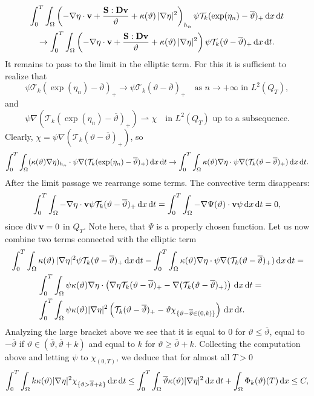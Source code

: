 \documentclass[11pt, a4paper, reqno]{amsart}
\numberwithin{equation}{section}
\newcommand{\diver}{\operatorname{div}}
\newcommand{\vc}[1]{{\bf #1}}
\newcommand{\vv}{\vc{v}}
\newcommand{\thet}{\vartheta}
\renewcommand{\S}{\mathbf{S}}
\newcommand{\D}{\mathbf{D}}
\newcommand{\dt}{\,{\rm d} t }
\newcommand{\dx}{\,{\rm d} {x}}
\newcommand{\dxdt}{\dx  \dt}
\newcommand{\etan}{\eta_n}
\newcommand{\QT}{Q_T}
\newcommand{\intO}[1]{\int_{\Omega} #1 \dx}
\newcommand{\intTO}[1]{\int_0^T \int_{\Omega} #1  \dxdt}
\newcommand{\T}{\mathcal{T}}
\newcommand{\tmax}{\overline{\thet}}
\begin{document}
\begin{equation}\label{eq:lim-stek1}
\begin{gathered}  \intTO{\left(-\nabla\eta\cdot\vv+\frac{\S:\D{\vv}}{\thet}+\kappa(\thet)\,|\nabla \eta|^2\right)_{h_n}\psi\T_k(\exp(\etan)-\tmax)_+}\\
  \to
  \intTO{\left(-\nabla\eta\cdot\vv+\frac{\S:\D{\vv}}{\thet}+\kappa(\thet)\,|\nabla \eta|^2\right)\psi\T_k(\thet-\tmax)_+}.
\end{gathered}
\end{equation}
It remains to pass to the limit in the elliptic term. For this it is sufficient to realize that 
$$
\psi\T_k(\exp(\etan)-\tmax)_+ \to \psi\T_k(\thet-\tmax)_+ \quad \text{as } n\to+\infty \text{ in } L^2(\QT),
$$
and 
$$
\psi\nabla(\T_k(\exp(\etan)-\tmax)_+) \rightharpoonup \chi \quad \text{in } L^2(\QT) \text{ up to a subsequence}.
$$
Clearly, $\chi = \psi\nabla(\T_k(\thet-\tmax)_+)$, so
$$
\intTO{(\kappa(\thet)\nabla\eta)_{h_n}\cdot \psi\nabla(\T_k(\exp(\etan)-\tmax)_+)} \to
\intTO{\kappa(\thet)\nabla\eta\cdot \psi\nabla(\T_k(\thet-\tmax)_+)}.
$$
After the limit passage we rearrange some terms. The convective term disappears:
$$
\intTO{-\nabla\eta\cdot\vv\psi\T_k(\thet-\tmax)_+} =
\intTO{-\nabla\Psi(\thet)\cdot\vv\psi} = 0,
$$
since $\diver \vv=0$ in $\QT$. Note here, that $\Psi$ is a properly chosen function. 
Let us now combine two terms connected with the elliptic term
\begin{equation}
  \begin{aligned}
  &\intTO{\kappa(\thet)\,|\nabla \eta|^2\psi\T_k(\thet-\tmax)_+}-\intTO{\kappa(\thet)\nabla\eta\cdot\psi\nabla(\T_k(\thet-\tmax)_+)}=\\
  &\phantom{MMM}\intTO{\psi\kappa(\thet)\nabla \eta\cdot\left(\nabla\eta\T_k(\thet-\tmax)_+-\nabla(\T_k(\thet-\tmax)_+)\right)}=\\
  &\phantom{MMM}\intTO{\psi\kappa(\thet)|\nabla \eta|^2\left(\T_k(\thet-\tmax)_+-\thet\chi_{\{\thet-\tmax\in(0,k)\}}\right)}.\\
\end{aligned}
\end{equation}
Analyzing the large bracket above we see that it is equal to $0$ for $\thet\leq\tmax$, equal to $-\tmax$ if $\thet \in(\tmax, \tmax+k)$ and equal to $k$ for $\thet\geq \tmax+k$. Collecting the computation above and letting $\psi$ to $\chi_{(0,T)}$, we deduce that for almost all $T>0$
\begin{equation}\label{limit-k}
\intTO{k\kappa(\thet)|\nabla \eta|^2\chi_{\{\thet>\tmax+k\}}}\leq
\intTO{\tmax\kappa(\thet)|\nabla \eta|^2}+\intO{\Phi_k(\thet)(T)}\leq C,
\end{equation}
\end{document}
